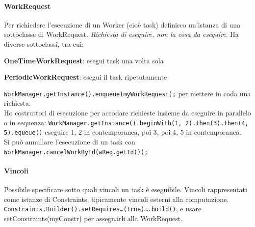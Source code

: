 \documentclass[10pt]{book}
\begin{document}
\paragraph{WorkRequest} Per richiedere l'esecuzione di un Worker (cioè task) definisco un'istanza di una sottoclasse di WorkRequest. \textit{Richiesta di eseguire, non la cosa da eseguire}. Ha diverse sottoclassi, tra cui:
\begin{list}{}{}
	\item \textbf{OneTimeWorkRequest}: esegui task una volta sola
	\item \textbf{PeriodicWorkRequest}: esegui il task ripetutamente
\end{list}
\texttt{WorkManager.getInstance().enqueue(myWorkRequest);} per mettere in coda una richiesta.\\
Ho costruttori di esecuzione per accodare richieste insieme da eseguire in parallelo o in sequenza:
\texttt{WorkManager.getInstance().beginWith(1, 2).then(3).then(4, 5).equeue()} eseguire 1, 2 in contemporanea, poi 3, poi 4, 5 in contemporanea.\\
Si può annullare l'esecuzione di un task con \texttt{WorkManager.cancelWorkById(wReq.getId());}
\paragraph{Vincoli} Possibile specificare sotto quali vincoli un task è eseguibile. Vincoli rappresentati come istanze di Constraints, tipicamente vincoli esterni alla computazione. \texttt{Constraints.Builder().setRequires\ldots(true)\ldots.build()}, e usare setConstraints(myConstr) per assegnarli alla WorkRequest.
\end{document}
